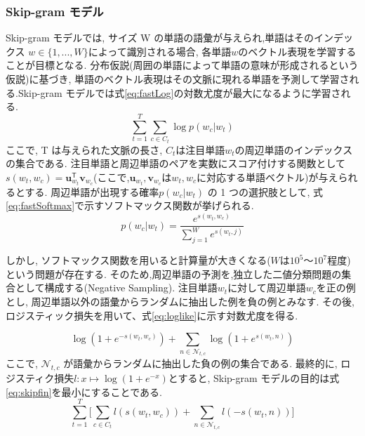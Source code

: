 \documentclass[a4j,twoside,12pt,dvipdfmx]{thesis} %
\begin{document}
\subsubsection*{Skip-gram モデル}
Skip-gram モデルでは, サイズ W の単語の語彙が与えられ,単語はそのインデックス $w \in \{ 1,...,W \}$によって識別される場合, 各単語$w$のベクトル表現を学習することが目標となる.
分布仮説(周囲の単語によって単語の意味が形成されるという仮説)に基づき, 単語のベクトル表現はその文脈に現れる単語を予測して学習される.Skip-gram モデルでは式\ref{eq:fastLog}の対数尤度が最大になるように学習される.
\begin{equation}
  \label{eq:fastLog}
  \sum_{t=1}^{T} \sum_{c \in C_{t}} \log p(w_{c} | w_{t})
\end{equation}
ここで, T は与えられた文脈の長さ, $C_{t}$は注目単語$w_{t}$の周辺単語のインデックスの集合である.
注目単語と周辺単語のペアを実数にスコア付けする関数として$s(w_{t}, w_{c}) = \mathbf{u}_{w_{t}}^\mathsf{T}\mathbf{v}_{w_{c}}$(ここで,$\mathbf{u}_{w_{t}}, \mathbf{v}_{w_{c}}$は$w_{t}, w_{c}$に対応する単語ベクトル)が与えられるとする.
周辺単語が出現する確率$p(w_{c} | w_{t})$ の 1 つの選択肢として, 式\ref{eq:fastSoftmax}で示すソフトマックス関数が挙げられる.
\begin{equation}
  \label{eq:fastSoftmax}
  p(w_{c} | w_{t}) = \dfrac{e^{s(w_{t}, w_{c})}}{\sum_{j=1}^{W} e^{s(w_{t}, j)}}
\end{equation}
\par しかし, ソフトマックス関数を用いると計算量が大きくなる($W$は$10^5 〜 10^7$程度)という問題が存在する.
そのため,周辺単語の予測を,独立した二値分類問題の集合として構成する(Negative Sampling).
注目単語$w_{t}$に対して周辺単語$w_{c}$を正の例とし, 周辺単語以外の語彙からランダムに抽出した例を負の例とみなす.
その後,ロジスティック損失を用いて、式\ref{eq:loglike}に示す対数尤度を得る.

\begin{equation}
  \label{eq:loglike}
  \log (1 + e^{-s(w_{t}, w_{c})}) + \sum_{n \in \mathcal{N}_{t,c}} \log (1 + e^{s(w_{t}, n)})
\end{equation}
ここで, $\mathcal{N}_{t,c}$ が語彙からランダムに抽出した負の例の集合である.
最終的に, ロジスティク損失$l : x \mapsto \log(1+e^{-x})$とすると, Skip-gram モデルの目的は式\ref{eq:skipfin}を最小にすることである.
\begin{equation}
  \label{eq:skipfin}
  \sum_{t=1}^{T} \Biggl\lbrack \sum_{c \in C_{t}} l(s(w_{t}, w_{c})) + \sum_{n \in \mathcal{N}_{t,c}} l(-s(w_{t}, n))\Biggr\rbrack
\end{equation}
\end{document}
